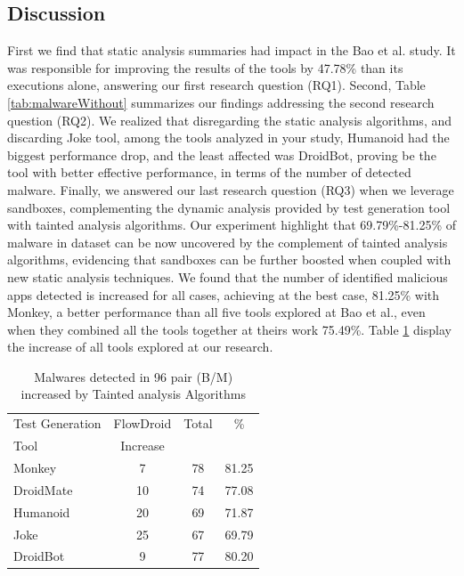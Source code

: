 


\subsection{Discussion}\label{sec:discussion}

First we find that static analysis summaries had impact in the Bao et al. study. It was responsible for improving the results of the tools by 47.78\% than its executions alone, answering our first research question (RQ1). Second, Table \ref{tab:malwareWithout} summarizes our findings addressing the second research question (RQ2). We realized that disregarding the static analysis algorithms, and discarding Joke tool, among the tools analyzed in your study, Humanoid had the biggest performance drop, and the least affected was DroidBot, proving be the tool with better effective performance, in terms of the number of detected malware. Finally, we answered our last research question (RQ3) when we leverage sandboxes, complementing the dynamic analysis provided by test generation tool with tainted analysis algorithms. Our experiment highlight that 69.79\%-81.25\% of malware in dataset can be now uncovered by the complement of tainted analysis algorithms, evidencing that 
sandboxes can be further boosted when coupled with new static analysis techniques. We found that the number of identified malicious apps detected is increased for all cases, achieving at the best case, 81.25\% with Monkey, a better performance than all five tools explored at Bao et al., even when they combined all the tools together at theirs work 75.49\%. Table \ref{tab:tanted} display the increase of all tools explored at our research.

\begin{table}[ht]
\centering
\begin{tabular}{lccc}\toprule
 Test Generation & FlowDroid & Total & \%\\
 Tool & Increase  &  & \\ \midrule
 Monkey & 7 & 78 & 81.25\\
 DroidMate & 10 &  74 & 77.08 \\
 Humanoid & 20 & 69 & 71.87  \\
 Joke & 25 & 67 & 69.79 \\
 DroidBot & 9 & 77 & 80.20  \\\midrule
 
\end{tabular} 
\caption{Malwares detected in 96 pair (B/M) increased by Tainted analysis Algorithms}
\label{tab:tanted}
\end{table}



